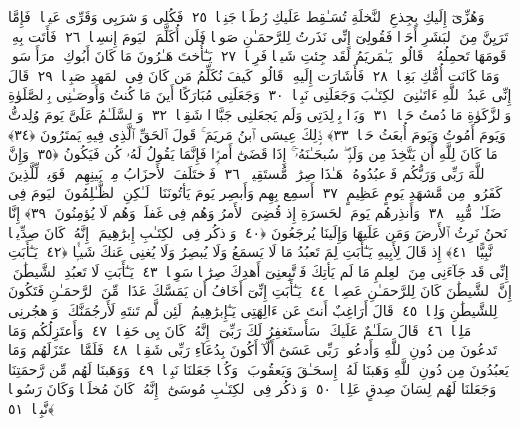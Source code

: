 وَهُزِّىٓ إِلَيكِ بِجِذعِ ٱلنَّخلَةِ تُسَـٰقِط عَلَيكِ رُطَبًۭا جَنِيًّۭا ﴿٢٥﴾
 فَكُلِى وَٱشرَبِى وَقَرِّى عَينًۭا ۖ فَإِمَّا تَرَيِنَّ مِنَ ٱلبَشَرِ أَحَدًۭا فَقُولِىٓ إِنِّى نَذَرتُ لِلرَّحمَـٰنِ صَومًۭا فَلَن أُكَلِّمَ ٱليَومَ إِنسِيًّۭا ﴿٢٦﴾
 فَأَتَت بِهِۦ قَومَهَا تَحمِلُهُۥ ۖ قَالُوا۟ يَـٰمَريَمُ لَقَد جِئتِ شَيـًۭٔا فَرِيًّۭا ﴿٢٧﴾
 يَـٰٓأُختَ هَـٰرُونَ مَا كَانَ أَبُوكِ ٱمرَأَ سَوءٍۢ وَمَا كَانَت أُمُّكِ بَغِيًّۭا ﴿٢٨﴾
 فَأَشَارَت إِلَيهِ ۖ قَالُوا۟ كَيفَ نُكَلِّمُ مَن كَانَ فِى ٱلمَهدِ صَبِيًّۭا ﴿٢٩﴾
 قَالَ إِنِّى عَبدُ ٱللَّهِ ءَاتَىٰنِىَ ٱلكِتَـٰبَ وَجَعَلَنِى نَبِيًّۭا ﴿٣٠﴾
 وَجَعَلَنِى مُبَارَكًا أَينَ مَا كُنتُ وَأَوصَـٰنِى بِٱلصَّلَوٰةِ وَٱلزَّكَوٰةِ مَا دُمتُ حَيًّۭا ﴿٣١﴾
 وَبَرًّۢا بِوَٟلِدَتِى وَلَم يَجعَلنِى جَبَّارًۭا شَقِيًّۭا ﴿٣٢﴾
 وَٱلسَّلَـٰمُ عَلَىَّ يَومَ وُلِدتُّ وَيَومَ أَمُوتُ وَيَومَ أُبعَثُ حَيًّۭا ﴿٣٣﴾
 ذَٟلِكَ عِيسَى ٱبنُ مَريَمَ ۚ قَولَ ٱلحَقِّ ٱلَّذِى فِيهِ يَمتَرُونَ ﴿٣٤﴾
 مَا كَانَ لِلَّهِ أَن يَتَّخِذَ مِن وَلَدٍۢ ۖ سُبحَـٰنَهُۥٓ ۚ إِذَا قَضَىٰٓ أَمرًۭا فَإِنَّمَا يَقُولُ لَهُۥ كُن فَيَكُونُ ﴿٣٥﴾
 وَإِنَّ ٱللَّهَ رَبِّى وَرَبُّكُم فَٱعبُدُوهُ ۚ هَـٰذَا صِرَٰطٌۭ مُّستَقِيمٌۭ ﴿٣٦﴾
 فَٱختَلَفَ ٱلأَحزَابُ مِنۢ بَينِهِم ۖ فَوَيلٌۭ لِّلَّذِينَ كَفَرُوا۟ مِن مَّشهَدِ يَومٍ عَظِيمٍ ﴿٣٧﴾
 أَسمِع بِهِم وَأَبصِر يَومَ يَأتُونَنَا ۖ لَـٰكِنِ ٱلظَّـٰلِمُونَ ٱليَومَ فِى ضَلَـٰلٍۢ مُّبِينٍۢ ﴿٣٨﴾
 وَأَنذِرهُم يَومَ ٱلحَسرَةِ إِذ قُضِىَ ٱلأَمرُ وَهُم فِى غَفلَةٍۢ وَهُم لَا يُؤمِنُونَ ﴿٣٩﴾
 إِنَّا نَحنُ نَرِثُ ٱلأَرضَ وَمَن عَلَيهَا وَإِلَينَا يُرجَعُونَ ﴿٤٠﴾
 وَٱذكُر فِى ٱلكِتَـٰبِ إِبرَٰهِيمَ ۚ إِنَّهُۥ كَانَ صِدِّيقًۭا نَّبِيًّا ﴿٤١﴾
 إِذ قَالَ لِأَبِيهِ يَـٰٓأَبَتِ لِمَ تَعبُدُ مَا لَا يَسمَعُ وَلَا يُبصِرُ وَلَا يُغنِى عَنكَ شَيـًۭٔا ﴿٤٢﴾
 يَـٰٓأَبَتِ إِنِّى قَد جَآءَنِى مِنَ ٱلعِلمِ مَا لَم يَأتِكَ فَٱتَّبِعنِىٓ أَهدِكَ صِرَٰطًۭا سَوِيًّۭا ﴿٤٣﴾
 يَـٰٓأَبَتِ لَا تَعبُدِ ٱلشَّيطَٰنَ ۖ إِنَّ ٱلشَّيطَٰنَ كَانَ لِلرَّحمَـٰنِ عَصِيًّۭا ﴿٤٤﴾
 يَـٰٓأَبَتِ إِنِّىٓ أَخَافُ أَن يَمَسَّكَ عَذَابٌۭ مِّنَ ٱلرَّحمَـٰنِ فَتَكُونَ لِلشَّيطَٰنِ وَلِيًّۭا ﴿٤٥﴾
 قَالَ أَرَاغِبٌ أَنتَ عَن ءَالِهَتِى يَـٰٓإِبرَٰهِيمُ ۖ لَئِن لَّم تَنتَهِ لَأَرجُمَنَّكَ ۖ وَٱهجُرنِى مَلِيًّۭا ﴿٤٦﴾
 قَالَ سَلَـٰمٌ عَلَيكَ ۖ سَأَستَغفِرُ لَكَ رَبِّىٓ ۖ إِنَّهُۥ كَانَ بِى حَفِيًّۭا ﴿٤٧﴾
 وَأَعتَزِلُكُم وَمَا تَدعُونَ مِن دُونِ ٱللَّهِ وَأَدعُوا۟ رَبِّى عَسَىٰٓ أَلَّآ أَكُونَ بِدُعَآءِ رَبِّى شَقِيًّۭا ﴿٤٨﴾
 فَلَمَّا ٱعتَزَلَهُم وَمَا يَعبُدُونَ مِن دُونِ ٱللَّهِ وَهَبنَا لَهُۥٓ إِسحَـٰقَ وَيَعقُوبَ ۖ وَكُلًّۭا جَعَلنَا نَبِيًّۭا ﴿٤٩﴾
 وَوَهَبنَا لَهُم مِّن رَّحمَتِنَا وَجَعَلنَا لَهُم لِسَانَ صِدقٍ عَلِيًّۭا ﴿٥٠﴾
 وَٱذكُر فِى ٱلكِتَـٰبِ مُوسَىٰٓ ۚ إِنَّهُۥ كَانَ مُخلَصًۭا وَكَانَ رَسُولًۭا نَّبِيًّۭا ﴿٥١﴾
